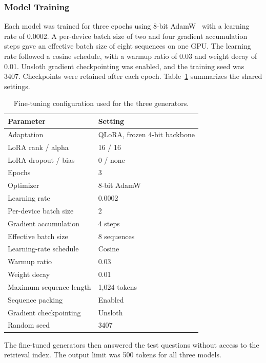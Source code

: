 \documentclass[10pt,journal,compsoc]{IEEEtran}
\begin{document}
\subsubsection{Model Training}

Each model was trained for three epochs using 8-bit AdamW~\cite{meth_loshchilov2019adamw} with a learning rate of 0.0002. A per-device batch size of two and four gradient accumulation steps gave an effective batch size of eight sequences on one GPU. The learning rate followed a cosine schedule, with a warmup ratio of 0.03 and weight decay of 0.01. Unsloth gradient checkpointing was enabled, and the training seed was 3407. Checkpoints were retained after each epoch. Table~\ref{tab:finetuning_settings} summarizes the shared settings.

\begin{table}[!t]
\centering
\caption{Fine-tuning configuration used for the three generators.}
\label{tab:finetuning_settings}
\footnotesize
\setlength{\tabcolsep}{3pt}
\renewcommand{\arraystretch}{1.1}
\begin{tabular}{p{}p{}}
\hline
\textbf{Parameter} & \textbf{Setting} \\
\hline
Adaptation & QLoRA, frozen 4-bit backbone \\
LoRA rank / alpha & 16 / 16 \\
LoRA dropout / bias & 0 / none \\
Epochs & 3 \\
Optimizer & 8-bit AdamW \\
Learning rate & 0.0002 \\
Per-device batch size & 2 \\
Gradient accumulation & 4 steps \\
Effective batch size & 8 sequences \\
Learning-rate schedule & Cosine \\
Warmup ratio & 0.03 \\
Weight decay & 0.01 \\
Maximum sequence length & 1,024 tokens \\
Sequence packing & Enabled \\
Gradient checkpointing & Unsloth \\
Random seed & 3407 \\
\hline
\end{tabular}
\end{table}

The fine-tuned generators then answered the test questions without access to the retrieval index. The output limit was 500 tokens for all three models.
\end{document}
